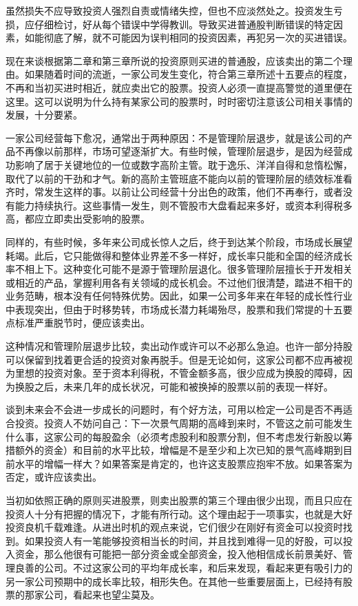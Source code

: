 \documentclass[UTF8,a4paper,zihao=-4,fontset = windows]{ctexart} %
\begin{document}
虽然损失不应导致投资人强烈自责或情绪失控，但也不应淡然处之。投资发生亏损，应仔细检讨，好从每个错误中学得教训。导致买进普通股判断错误的特定因素，如能彻底了解，就不可能因为误判相同的投资因素，再犯另一次的买进错误。

现在来谈根据第二章和第三章所说的投资原则买进的普通股，应该卖出的第二个理由。如果随着时间的流逝，一家公司发生变化，符合第三章所述十五要点的程度，不再和当初买进时相近，就应卖出它的股票。投资人必须一直提高警觉的道里便在这里。这可以说明为什么持有某家公司的股票时，时时密切注意该公司相关事情的发展，十分要紧。

一家公司经营每下愈况，通常出于两种原因：不是管理阶层退步，就是该公司的产品不再像以前那样，市场可望逐渐扩大。有些时候，管理阶层退步，是因为经营成功影响了居于关键地位的一位或数字高阶主管。耽于逸乐、洋洋自得和怠惰松懈，取代了以前的干劲和才气。新的高阶主管班底不能向以前的管理阶层的绩效标准看齐时，常发生这样的事。以前让公司经营十分出色的政策，他们不再奉行，或者没有能力持续执行。这些事情一发生，则不管股市大盘看起来多好，或资本利得税多高，都应立即卖出受影响的股票。

同样的，有些时候，多年来公司成长惊人之后，终于到达某个阶段，市场成长展望耗竭。此后，它只能做得和整体业界差不多一样好，成长率只能和全国的经济成长率不相上下。这种变化可能不是源于管理阶层退化。很多管理阶层擅长于开发相关或相近的产品，掌握利用各有关领域的成长机会。不过他们很清楚，踏进不相干的业务范畴，根本没有任何特殊优势。因此，如果一公司多年来在年轻的成长性行业中表现突出，但由于时移势转，市场成长潜力耗竭殆尽，股票和我们常提的十五要点标准严重脱节时，便应该卖出。

这种情况和管理阶层退步比较，卖出动作或许可以不必那么急迫。也许一部分持股可以保留到找着更合适的投资对象再脱手。但是无论如何，这家公司都不应再被视为里想的投资对象。至于资本利得税，不管金额多高，很少应成为换股的障碍，因为换股之后，未来几年的成长状况，可能和被换掉的股票以前的表现一样好。

谈到未来会不会进一步成长的问题时，有个好方法，可用以检定一公司是否不再适合投资。投资人不妨问自己：下一次景气周期的高峰到来时，不管这之前可能发生什么事，这家公司的每股盈余（必须考虑股利和股票分割，但不考虑发行新股以筹措额外的资金）和目前的水平比较，增幅是不是至少和上次已知的景气高峰期到目前水平的增幅一样大？如果答案是肯定的，也许这支股票应抱牢不放。如果答案为否定，或许应该卖出。

当初如依照正确的原则买进股票，则卖出股票的第三个理由很少出现，而且只应在投资人十分有把握的情况下，才能有所行动。这个理由起于一项事实，也就是大好投资良机千载难逢。从进出时机的观点来说，它们很少在刚好有资金可以投资时找到。如果投资人有一笔能够投资相当长的时间，并且找到难得一见的好股，可以投入资金，那么他很有可能把一部分资金或全部资金，投入他相信成长前景美好、管理良善的公司。不过这家公司的平均年成长率，和后来发现，看起来更有吸引力的另一家公司预期中的成长率比较，相形失色。在其他一些重要层面上，已经持有股票的那家公司，看起来也望尘莫及。
\end{document}

